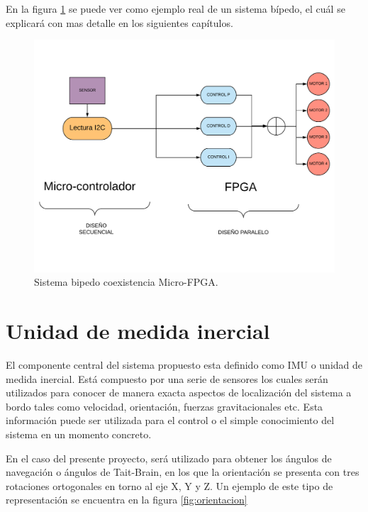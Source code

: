 En la figura \ref{fig:bipedo} se puede ver como ejemplo real de un sistema bípedo, el cuál se explicará con mas detalle en los siguientes capítulos.

\begin{center}
	\begin{figure}[H]
		\center
		\includegraphics[scale=0.5]{imagenes/EstadoArte/bipedo.pdf}
		\caption{Sistema bipedo coexistencia Micro-FPGA.}
		\label{fig:bipedo}
	\end{figure}
\end{center}
\section{Unidad de medida inercial}
El componente central del sistema propuesto esta definido como IMU o unidad de medida inercial. Está compuesto por una serie de sensores los cuales serán utilizados para conocer de manera exacta aspectos de localización del sistema a bordo tales como velocidad, orientación, fuerzas gravitacionales etc. \newline
Esta información puede ser utilizada para el control o el simple conocimiento del sistema en un momento concreto. \newline

En el caso del presente proyecto, será utilizado para obtener los ángulos de navegación o ángulos de Tait-Brain, en los que la orientación se presenta con tres rotaciones ortogonales en torno al eje X, Y y Z. Un ejemplo de este tipo de representación se encuentra en la figura \ref{fig:orientacion}\newline


